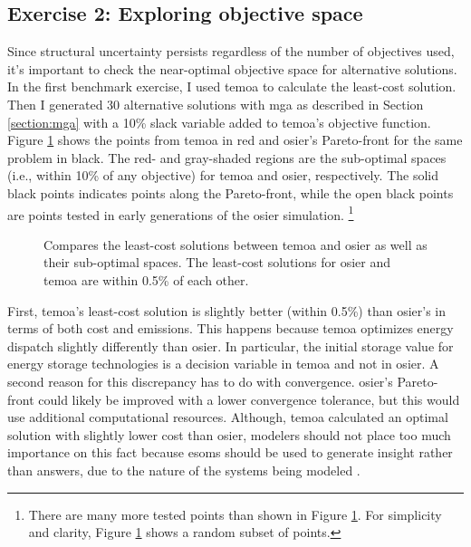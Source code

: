 \subsection{Exercise 2: Exploring objective space}
Since structural uncertainty persists regardless of the number of objectives
used, it's important to check the near-optimal objective space for alternative
solutions. In the first benchmark exercise, I used \ac{temoa} to calculate the
least-cost solution. Then I generated 30 alternative solutions with \ac{mga} as
described in Section \ref{section:mga} with a 10\% slack variable added to
\ac{temoa}'s objective function. Figure \ref{fig:temoa-benchmark-01} shows the
points from \ac{temoa} in red and \ac{osier}'s Pareto-front for the same problem
in black. The red- and gray-shaded regions are the sub-optimal spaces (i.e.,
within 10\% of any objective) for \ac{temoa} and \ac{osier}, respectively.
The solid black points indicates points along the Pareto-front, while the open
black points are points tested in early generations of the \ac{osier} simulation.
\footnote{There are many more tested points than shown in Figure \ref{fig:temoa-benchmark-01}. 
For simplicity and clarity, Figure \ref{fig:temoa-benchmark-01} shows a random subset
of points.}

\begin{figure}[h]
  \centering
  \resizebox{0.75\columnwidth}{!}{}
  \caption{Compares the least-cost solutions between \acs{temoa}
  and \acs{osier} as well as their sub-optimal spaces. The least-cost solutions
  for \ac{osier} and \ac{temoa} are within 0.5\% of each other.}
  \label{fig:temoa-benchmark-01}
\end{figure}

First, \ac{temoa}'s least-cost solution is slightly better (within 0.5\%) than
\ac{osier}'s in terms of both cost and emissions. This happens because
\ac{temoa} optimizes energy dispatch slightly differently than \ac{osier}. In
particular, the initial storage value for energy storage technologies is a
decision variable in \ac{temoa} and not in \ac{osier}. A second reason for this
discrepancy has to do with convergence. \ac{osier}'s Pareto-front could likely
be improved with a lower convergence tolerance, but this would use additional
computational resources. Although, \ac{temoa} calculated an optimal solution
with slightly lower cost than \ac{osier}, modelers should not place too much
importance on this fact because \acp{esom} should be used to generate insight
rather than answers, due to the nature of the systems being modeled
\cite{decarolis_using_2011}.

